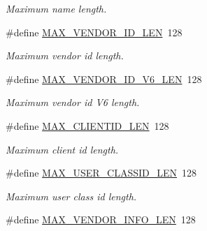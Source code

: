 \begin{DoxyCompactItemize}
\begin{DoxyCompactList}\small\item\em Maximum name length. \end{DoxyCompactList}\item 
\hypertarget{group__FAPI__QOS__CLASS_gab08625a5eeb8582d69b40054201d9116}{\#define \hyperlink{group__FAPI__QOS__CLASS_gab08625a5eeb8582d69b40054201d9116}{M\-A\-X\-\_\-\-V\-E\-N\-D\-O\-R\-\_\-\-I\-D\-\_\-\-L\-E\-N}~128}\label{group__FAPI__QOS__CLASS_gab08625a5eeb8582d69b40054201d9116}

\begin{DoxyCompactList}\small\item\em Maximum vendor id length. \end{DoxyCompactList}\item 
\hypertarget{group__FAPI__QOS__CLASS_ga2f264f80b185aa3d6b10d73051b5ca33}{\#define \hyperlink{group__FAPI__QOS__CLASS_ga2f264f80b185aa3d6b10d73051b5ca33}{M\-A\-X\-\_\-\-V\-E\-N\-D\-O\-R\-\_\-\-I\-D\-\_\-\-V6\-\_\-\-L\-E\-N}~128}\label{group__FAPI__QOS__CLASS_ga2f264f80b185aa3d6b10d73051b5ca33}

\begin{DoxyCompactList}\small\item\em Maximum vendor id V6 length. \end{DoxyCompactList}\item 
\hypertarget{group__FAPI__QOS__CLASS_gaff8356674e70c7efac546eee41ed1651}{\#define \hyperlink{group__FAPI__QOS__CLASS_gaff8356674e70c7efac546eee41ed1651}{M\-A\-X\-\_\-\-C\-L\-I\-E\-N\-T\-I\-D\-\_\-\-L\-E\-N}~128}\label{group__FAPI__QOS__CLASS_gaff8356674e70c7efac546eee41ed1651}

\begin{DoxyCompactList}\small\item\em Maximum client id length. \end{DoxyCompactList}\item 
\hypertarget{group__FAPI__QOS__CLASS_ga668aa676079b70d11fd2f1ef9044dcfb}{\#define \hyperlink{group__FAPI__QOS__CLASS_ga668aa676079b70d11fd2f1ef9044dcfb}{M\-A\-X\-\_\-\-U\-S\-E\-R\-\_\-\-C\-L\-A\-S\-S\-I\-D\-\_\-\-L\-E\-N}~128}\label{group__FAPI__QOS__CLASS_ga668aa676079b70d11fd2f1ef9044dcfb}

\begin{DoxyCompactList}\small\item\em Maximum user class id length. \end{DoxyCompactList}\item 
\hypertarget{group__FAPI__QOS__CLASS_ga490480957ae3800d1b1af04261aea96f}{\#define \hyperlink{group__FAPI__QOS__CLASS_ga490480957ae3800d1b1af04261aea96f}{M\-A\-X\-\_\-\-V\-E\-N\-D\-O\-R\-\_\-\-I\-N\-F\-O\-\_\-\-L\-E\-N}~128}\label{group__FAPI__QOS__CLASS_ga490480957ae3800d1b1af04261aea96f}


\end{DoxyCompactItemize}

